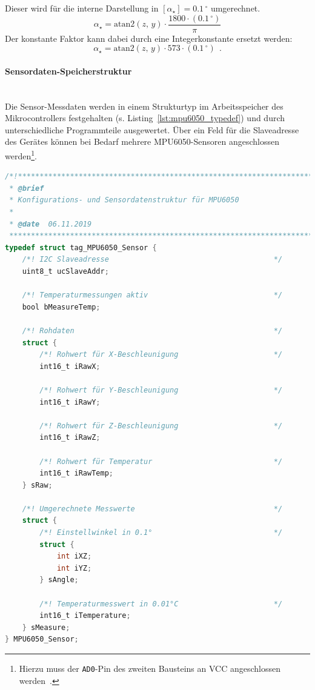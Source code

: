             Dieser wird für die interne Darstellung in $[\alpha_\star] = 0.1\,^\circ$ umgerechnet.
            \begin{equation*}
                \alpha_\star = \mathrm{atan2}(z,\,y) \cdot \frac{1800\cdot (0.1\,^\circ)}{\pi}
            \end{equation*}
            Der konstante Faktor kann dabei durch eine Integerkonstante ersetzt werden:
            \begin{equation*}
                \alpha_\star = \mathrm{atan2}(z,\,y) \cdot 573 \cdot (0.1\,^\circ)~~.
            \end{equation*}
        
            \paragraph{Sensordaten-Speicherstruktur}\mbox{}\\
            Die Sensor-Messdaten werden in einem Strukturtyp im Arbeitsspeicher des Mikrocontrollers festgehalten (s. Listing~\ref{lst:mpu6050_typedef}) und durch unterschiedliche Programmteile ausgewertet. Über ein Feld für die Slaveadresse des Gerätes können bei Bedarf mehrere MPU6050-Sensoren angeschlossen werden\footnote{Hierzu muss der \texttt{AD0}-Pin des zweiten Bausteins an VCC angeschlossen werden~\cite[Kap 9.2]{ds_mpu6050}.}.
            
            \begin{lstlisting}[language=C,caption={Typdefinition für die Sensordatenstruktur des MPU6050},label=lst:mpu6050_typedef]
/*!****************************************************************************
 * @brief
 * Konfigurations- und Sensordatenstruktur für MPU6050
 *
 * @date  06.11.2019
 ******************************************************************************/
typedef struct tag_MPU6050_Sensor {
    /*! I2C Slaveadresse                                      */
    uint8_t ucSlaveAddr;
    
    /*! Temperaturmessungen aktiv                             */
    bool bMeasureTemp;
    
    /*! Rohdaten                                              */
    struct {
        /*! Rohwert für X-Beschleunigung                      */
        int16_t iRawX;
        
        /*! Rohwert für Y-Beschleunigung                      */
        int16_t iRawY;
        
        /*! Rohwert für Z-Beschleunigung                      */
        int16_t iRawZ;
        
        /*! Rohwert für Temperatur                            */
        int16_t iRawTemp;
    } sRaw;
    
    /*! Umgerechnete Messwerte                                */
    struct {
        /*! Einstellwinkel in 0.1°                            */
        struct {
            int iXZ;
            int iYZ;
        } sAngle;
    
        /*! Temperaturmesswert in 0.01°C                      */
        int16_t iTemperature;
    } sMeasure;
} MPU6050_Sensor;
            \end{lstlisting}
            

